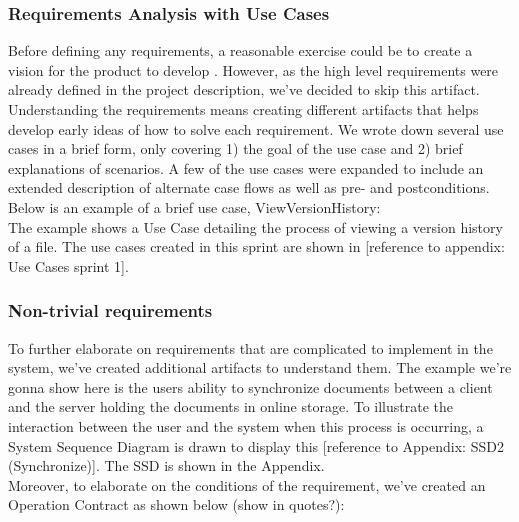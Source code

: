\subsubsection{Requirements Analysis with Use Cases}
Before defining any requirements, a reasonable exercise could be to create a vision for the product to develop \cite[p.~58]{OOAD}. However, as the high level requirements were already defined in the project description, we’ve decided to skip this artifact.\\
\newline
Understanding the requirements means creating different artifacts that helps develop early ideas of how to solve each requirement. We wrote down several use cases in a brief form, only covering 1) the goal of the use case and 2) brief explanations of scenarios. A few of the use cases were expanded to include an extended description of alternate case flows as well as pre- and postconditions. Below is an example of a brief use case, ViewVersionHistory:\\
The example shows a Use Case detailing the process of viewing a version history of a file.
The use cases created in this sprint are shown in [reference to appendix: Use Cases sprint 1].\\
\subsubsection{Non-trivial requirements}
To further elaborate on requirements that are complicated to implement in the system, we’ve created additional artifacts to understand them. The example we’re gonna show here is the users ability to synchronize documents between a client and the server holding the documents in online storage. To illustrate the interaction between the user and the system when this process is occurring, a System Sequence Diagram is drawn to display this [reference to Appendix: SSD2 (Synchronize)]. The SSD is shown in the Appendix.\\
Moreover, to elaborate on the conditions of the requirement, we’ve created an Operation Contract as shown below (show in quotes?):\\

